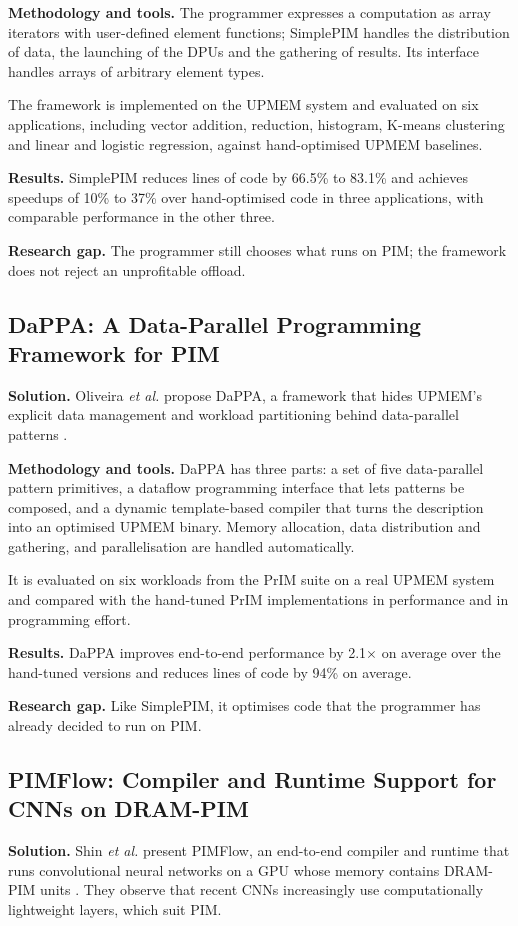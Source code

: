 \documentclass{ieeeaccess}
\begin{document}
\textbf{Methodology and tools.} The programmer expresses a computation as array iterators with user-defined element functions; SimplePIM handles the distribution of data, the launching of the DPUs and the gathering of results. Its interface handles arrays of arbitrary element types.

The framework is implemented on the UPMEM system and evaluated on six applications, including vector addition, reduction, histogram, K-means clustering and linear and logistic regression, against hand-optimised UPMEM baselines.

\textbf{Results.} SimplePIM reduces lines of code by 66.5\% to 83.1\% and achieves speedups of 10\% to 37\% over hand-optimised code in three applications, with comparable performance in the other three.

\textbf{Research gap.} The programmer still chooses what runs on PIM; the framework does not reject an unprofitable offload.

\subsection{DaPPA: A Data-Parallel Programming Framework for PIM}
\textbf{Solution.} Oliveira \emph{et al.} propose DaPPA, a framework that hides UPMEM's explicit data management and workload partitioning behind data-parallel patterns \cite{oliveira2023dappa}.

\textbf{Methodology and tools.} DaPPA has three parts: a set of five data-parallel pattern primitives, a dataflow programming interface that lets patterns be composed, and a dynamic template-based compiler that turns the description into an optimised UPMEM binary. Memory allocation, data distribution and gathering, and parallelisation are handled automatically.

It is evaluated on six workloads from the PrIM suite on a real UPMEM system and compared with the hand-tuned PrIM implementations in performance and in programming effort.

\textbf{Results.} DaPPA improves end-to-end performance by 2.1$\times$ on average over the hand-tuned versions and reduces lines of code by 94\% on average.

\textbf{Research gap.} Like SimplePIM, it optimises code that the programmer has already decided to run on PIM.

\subsection{PIMFlow: Compiler and Runtime Support for CNNs on DRAM-PIM}
\textbf{Solution.} Shin \emph{et al.} present PIMFlow, an end-to-end compiler and runtime that runs convolutional neural networks on a GPU whose memory contains DRAM-PIM units \cite{shin2023pimflow}. They observe that recent CNNs increasingly use computationally lightweight layers, which suit PIM.
\end{document}
